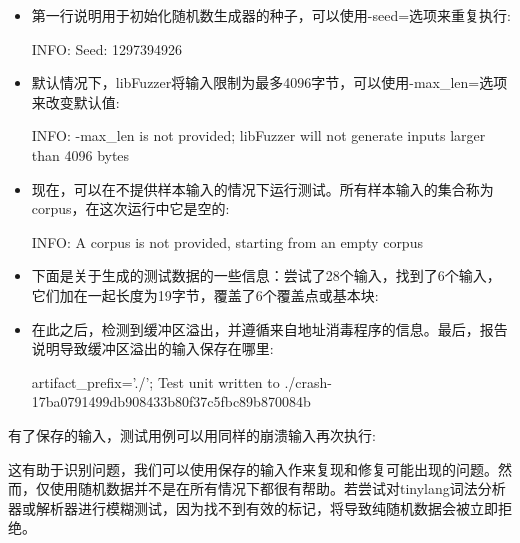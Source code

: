 \begin{itemize}
\item
第一行说明用于初始化随机数生成器的种子，可以使用-seed=选项来重复执行:

\begin{shell}
INFO: Seed: 1297394926
\end{shell}

\item
默认情况下，libFuzzer将输入限制为最多4096字节，可以使用-max\_len=选项来改变默认值:

\begin{shell}
INFO: -max_len is not provided; libFuzzer will not generate
inputs larger than 4096 bytes
\end{shell}

\item
现在，可以在不提供样本输入的情况下运行测试。所有样本输入的集合称为corpus，在这次运行中它是空的:

\begin{shell}
INFO: A corpus is not provided, starting from an empty corpus
\end{shell}

\item
下面是关于生成的测试数据的一些信息：尝试了28个输入，找到了6个输入，它们加在一起长度为19字节，覆盖了6个覆盖点或基本块:


\item
在此之后，检测到缓冲区溢出，并遵循来自地址消毒程序的信息。最后，报告说明导致缓冲区溢出的输入保存在哪里:

\begin{shell}
artifact_prefix='./'; Test unit written to ./crash-17ba0791499db908433b80f37c5fbc89b870084b
\end{shell}
\end{itemize}

有了保存的输入，测试用例可以用同样的崩溃输入再次执行:


这有助于识别问题，我们可以使用保存的输入作来复现和修复可能出现的问题。然而，仅使用随机数据并不是在所有情况下都很有帮助。若尝试对tinylang词法分析器或解析器进行模糊测试，因为找不到有效的标记，将导致纯随机数据会被立即拒绝。

